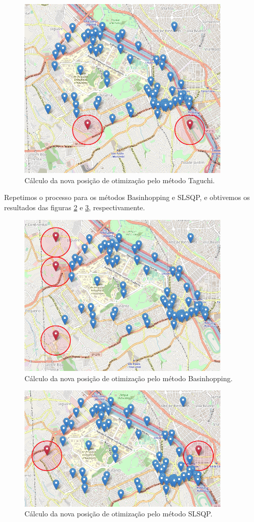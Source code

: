 \documentclass[]{politex}
\begin{document}
\begin{figure}[H]
    \centering
    \includegraphics[width=4in]{imagens/taguchi-exemplo}
    \caption{Cálculo da nova posição de otimização pelo método Taguchi.}
    \label{fig:taguchi_exemplo}
\end{figure}

Repetimos o processo para os métodos Basinhopping e SLSQP, e obtivemos os
resultados das figuras \ref{fig:basinhopping_exemplo} e \ref{fig:slsqp_exemplo},
respectivamente.

\begin{figure}[H]
    \centering
    \includegraphics[width=4in]{imagens/basinhopping-exemplo}
    \caption{Cálculo da nova posição de otimização pelo método Basinhopping.}
    \label{fig:basinhopping_exemplo}
\end{figure}

\begin{figure}[H]
    \centering
    \includegraphics[width=4in]{imagens/slsqp-exemplo}
    \caption{Cálculo da nova posição de otimização pelo método SLSQP.}
    \label{fig:slsqp_exemplo}
\end{figure}
\end{document}
